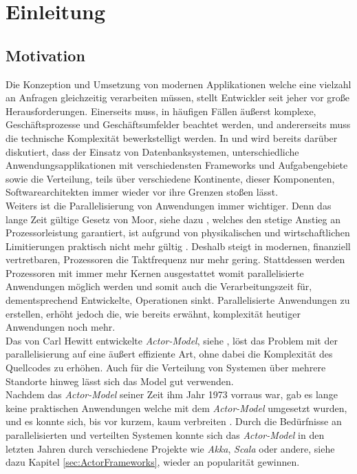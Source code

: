 \chapter{Einleitung}\label{cha:introduction}
\section{Motivation}\label{sec:introduction:motivation}
Die Konzeption und Umsetzung von modernen Applikationen welche eine vielzahl an Anfragen gleichzeitig verarbeiten müssen, stellt Entwickler seit jeher vor große Herausforderungen. Einerseits muss, in häufigen Fällen äußerst komplexe, Geschäftsprozesse und Geschäftsumfelder beachtet werden, und andererseits muss die technische Komplexität bewerkstelligt werden. In \cite{Vernon2015ReactiveAkka} und \cite{Evans2004Domain-drivenSoftware} wird bereits darüber diskutiert, dass der Einsatz von Datenbanksystemen, unterschiedliche Anwendungsapplikationen mit verschiedensten Frameworks und Aufgabengebiete sowie die Verteilung, teils über verschiedene Kontinente, dieser Komponenten, Softwarearchitekten immer wieder vor ihre Grenzen stoßen lässt. \\
Weiters ist die Parallelisierung von Anwendungen immer wichtiger. Denn das lange Zeit gültige Gesetz von Moor, siehe dazu \cite{moore1965moore}, welches den stetige Anstieg an Prozessorleistung garantiert, ist aufgrund von physikalischen und wirtschaftlichen Limitierungen praktisch nicht mehr gültig \citep{mann2000end}. Deshalb steigt in modernen, finanziell vertretbaren, Prozessoren die Taktfrequenz nur mehr gering. Stattdessen werden Prozessoren mit immer mehr Kernen ausgestattet womit parallelisierte Anwendungen möglich werden und somit auch die Verarbeitungszeit für, dementsprechend Entwickelte, Operationen sinkt. Parallelisierte Anwendungen zu erstellen, erhöht jedoch die, wie bereits erwähnt, komplexität heutiger Anwendungen noch mehr. \\
Das von Carl Hewitt entwickelte \textit{Actor-Model}, siehe \cite{Hewitt1973AIntelligence}, löst das Problem mit der parallelisierung auf eine äußert effiziente Art, ohne dabei die Komplexität des Quellcodes zu erhöhen. Auch für die Verteilung von Systemen über mehrere Standorte hinweg lässt sich das Model gut verwenden. \\
Nachdem das \textit{Actor-Model} seiner Zeit ihm Jahr 1973 vorraus war, gab es lange keine praktischen Anwendungen welche mit dem \textit{Actor-Model} umgesetzt wurden, und es konnte sich, bis vor kurzem, kaum verbreiten \citep{mackay1997has}. Durch die Bedürfnisse an parallelisierten und verteilten Systemen konnte sich das \textit{Actor-Model} in den letzten Jahren durch verschiedene Projekte wie \textit{Akka}, \textit{Scala} oder andere, siehe dazu Kapitel \ref{sec:ActorFrameworks}, wieder an popularität gewinnen.

